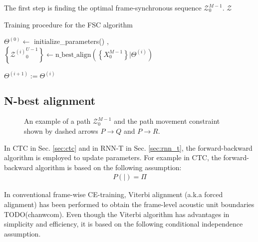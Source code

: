 \documentclass{article}
\begin{document}
The first step is finding the optimal frame-synchronous sequence
$\mathcal{Z}_0^{M-1}$.   
$\mathcal{Z}$


\begin{algorithm}
  \caption{Training procedure for the FSC algorithm}
  \label{algo:fsc_training}
  \begin{algorithmic}
    \State $\Theta^{(0)} \leftarrow$ initialize\_parameters()
      , 
        \State $\left\{ {{\mathcal{Z}^{(i)}}_0^{U-1}} \right\}
          \leftarrow
          \text{n\_best\_align}
          \left(
            \left\{X_{0}^{M-1} \right\} \Big| \Theta^{(i)}
          \right)$


    \EndFor
    \State $\Theta^{(i+1)} := \Theta^{(i)}$
  \EndFor
  \label{algorithm:fsc_training}
  \end{algorithmic}
\end{algorithm}



\subsection{N-best alignment}
\label{sec:n_best_alignment}


\begin{figure}
  \centering
    \resizebox{100mm}{!}{
      
    } 
    \caption {
      An example of a path $\mathcal{Z}_{0}^{M-1}$ and the path movement 
      constraint shown by dashed arrows $P \rightarrow Q$ and $P \rightarrow R$. 
      \label{fig:path_alignment}
    }
  \label{fig:path_alignment}
\end{figure}

In CTC in Sec. \ref{sec:ctc} and in RNN-T in Sec. \ref{sec:rnn_t}, the 
forward-backward algorithm is employed to update parameters. 
For example in CTC, the forward-backward algorithm is based on the
following assumption:
\begin{align}
  P \left(  \Big| \right) = \Pi
\end{align}

In conventional frame-wise CE-training, Viterbi alignment 
(a.k.a forced alignment) has been performed to obtain the frame-level 
acoustic unit  boundaries TODO(chanwcom). Even though the Viterbi algorithm
has advantages in simplicity and efficiency, it is based on
the following conditional independence assumption.
\end{document}
